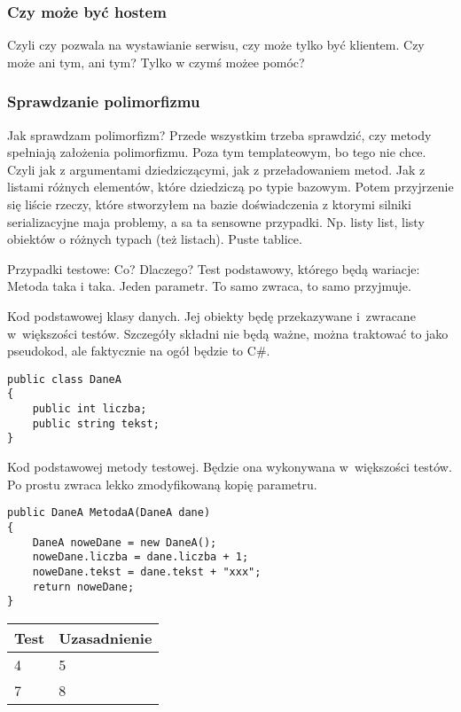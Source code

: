 \subsubsection{Czy może być hostem}
Czyli czy pozwala na wystawianie serwisu, czy może tylko być klientem. Czy może ani tym, ani tym? Tylko w czymś możee pomóc?

\subsubsection{Sprawdzanie polimorfizmu}
Jak sprawdzam polimorfizm?
Przede wszystkim trzeba sprawdzić, czy metody spełniają założenia polimorfizmu. Poza tym templateowym, bo tego nie chce. Czyli jak z argumentami dziedziczącymi, jak z przeładowaniem metod. Jak z listami różnych elementów, które dziedziczą po typie bazowym.
Potem przyjrzenie się liście rzeczy, które stworzyłem na bazie doświadczenia z ktorymi silniki serializacyjne maja problemy, a sa ta sensowne przypadki. Np. listy list, listy obiektów o różnych typach (też listach). Puste tablice.

Przypadki testowe:
Co? Dlaczego?
Test podstawowy, którego będą wariacje:
Metoda taka i taka. Jeden parametr. To samo zwraca, to samo przyjmuje.


Kod podstawowej klasy danych. Jej obiekty będę przekazywane i~zwracane w~większości testów.
Szczegóły składni nie będą ważne, można traktować to jako pseudokod, ale faktycznie na ogół będzie to C\#.

\begin{lstlisting}[frame=single, caption={Przykładowa klasa danych}, label=kod:testData]
public class DaneA
{
	public int liczba;
	public string tekst;
}
\end{lstlisting}

Kod podstawowej metody testowej. Będzie ona wykonywana w~większości testów.
Po prostu zwraca lekko zmodyfikowaną kopię parametru.

\begin{lstlisting}[frame=single, caption={Przykładowa zdalna metoda}, label=kod:testMethod]
public DaneA MetodaA(DaneA dane)
{
	DaneA noweDane = new DaneA();
	noweDane.liczba = dane.liczba + 1;
	noweDane.tekst = dane.tekst + "xxx";	
	return noweDane;
}
\end{lstlisting}

\begin{tabular}{ | l | l | }
  \hline
	\textbf{Test} & \textbf{Uzasadnienie} \\
	\hline \hline
  4 & 5 \\
	\hline
  7 & 8 \\
	\hline
\end{tabular}

